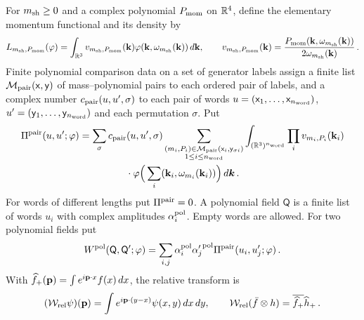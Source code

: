 \begin{definition}\label{def:polynomial-comparisons}
For $m_{\rm sh}\ge0$ and a complex polynomial $P_{\rm mom}$ on $\mathbb{R}^4$, define the elementary momentum functional and its density by
\begin{equation}\label{eq:momentum-functional}
L_{m_{\rm sh},P_{\rm mom}}(\varphi)=\int_{\mathbb{R}^3}v_{m_{\rm sh},P_{\rm mom}}(\mathbf k)\varphi(\mathbf k,\omega_{m_{\rm sh}}(\mathbf k))\,d\mathbf k,\qquad v_{m_{\rm sh},P_{\rm mom}}(\mathbf k)=\frac{P_{\rm mom}(\mathbf k,\omega_{m_{\rm sh}}(\mathbf k))}{2\omega_{m_{\rm sh}}(\mathbf k)}\,.
\end{equation}
Finite polynomial comparison data on a set of generator labels assign a finite list $\mathcal M_{\rm pair}(\mathsf x,\mathsf y)$ of mass--polynomial pairs to each ordered pair of labels, and a complex number $c_{\rm pair}(u,u',\sigma)$ to each pair of words $u=(\mathsf x_1,\ldots,\mathsf x_{n_{\rm word}})$, $u'=(\mathsf y_1,\ldots,\mathsf y_{n_{\rm word}})$ and each permutation $\sigma$. Put
\begin{multline}\label{eq:polynomial-pairing}
\Pi^{\rm pair}(u,u';\varphi)=\sum_\sigma c_{\rm pair}(u,u',\sigma)\sum_{\substack{(m_i,P_i)\in\mathcal M_{\rm pair}(\mathsf x_i,\mathsf y_{\sigma i})\\1\le i\le n_{\rm word}}}\int_{(\mathbb{R}^3)^{n_{\rm word}}}\prod_i v_{m_i,P_i}(\mathbf k_i)\\
{}\cdot\varphi\Big(\sum_i(\mathbf k_i,\omega_{m_i}(\mathbf k_i))\Big)\,d\boldsymbol k\,.
\end{multline}
For words of different lengths put $\Pi^{\rm pair}=0$. A polynomial field $\mathsf Q$ is a finite list of words $u_i$ with complex amplitudes $\alpha_i^{\rm pol}$. Empty words are allowed. For two polynomial fields put
\begin{equation}\label{eq:polynomial-correlation}
W^{\rm pol}(\mathsf Q,\mathsf Q';\varphi)=\sum_{i,j}\alpha_i^{\rm pol}{\alpha'_j}^{\rm pol}\Pi^{\rm pair}(u_i,u'_j;\varphi)\,.
\end{equation}
With $\widehat{f}_{+}(\mathbf p)=\int e^{i\mathbf p\cdot x}f(x)\,dx$, the relative transform is
\begin{equation}\label{eq:relative-fourier}
(\mathcal{W}_{\mathrm{rel}}\psi)(\mathbf p)=\int e^{i\mathbf p\cdot(y-x)}\psi(x,y)\,dx\,dy,\qquad \mathcal{W}_{\mathrm{rel}}(\bar f\otimes h)=\overline{\widehat{f}_{+}}\widehat{h}_{+}\,.
\end{equation}
\end{definition}

